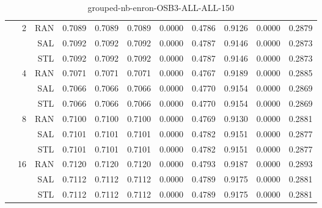 \begin{center}
\begin{table}[htbp]
\begin{tabular}{ | r | r | r | r | r | r | r | r | r | r | r |}
 & \multirow{3}{*}{2} & RAN & 0.7089 & 0.7089 & 0.7089 & 0.0000 & 0.4786 & 0.9126 & 0.0000 & 0.2879\\ \cline{3-11}
 &   & SAL & 0.7092 & 0.7092 & 0.7092 & 0.0000 & 0.4787 & 0.9146 & 0.0000 & 0.2873\\ \cline{3-11}
 &   & STL & 0.7092 & 0.7092 & 0.7092 & 0.0000 & 0.4787 & 0.9146 & 0.0000 & 0.2873\\ \cline{2-11}
 & \multirow{3}{*}{4} & RAN & 0.7071 & 0.7071 & 0.7071 & 0.0000 & 0.4767 & 0.9189 & 0.0000 & 0.2885\\ \cline{3-11}
 &   & SAL & 0.7066 & 0.7066 & 0.7066 & 0.0000 & 0.4770 & 0.9154 & 0.0000 & 0.2869\\ \cline{3-11}
 &   & STL & 0.7066 & 0.7066 & 0.7066 & 0.0000 & 0.4770 & 0.9154 & 0.0000 & 0.2869\\ \cline{2-11}
 & \multirow{3}{*}{8} & RAN & 0.7100 & 0.7100 & 0.7100 & 0.0000 & 0.4769 & 0.9130 & 0.0000 & 0.2881\\ \cline{3-11}
 &   & SAL & 0.7101 & 0.7101 & 0.7101 & 0.0000 & 0.4782 & 0.9151 & 0.0000 & 0.2877\\ \cline{3-11}
 &   & STL & 0.7101 & 0.7101 & 0.7101 & 0.0000 & 0.4782 & 0.9151 & 0.0000 & 0.2877\\ \cline{2-11}
 & \multirow{3}{*}{16} & RAN & 0.7120 & 0.7120 & 0.7120 & 0.0000 & 0.4793 & 0.9187 & 0.0000 & 0.2893\\ \cline{3-11}
 &   & SAL & 0.7112 & 0.7112 & 0.7112 & 0.0000 & 0.4789 & 0.9175 & 0.0000 & 0.2881\\ \cline{3-11}
 &   & STL & 0.7112 & 0.7112 & 0.7112 & 0.0000 & 0.4789 & 0.9175 & 0.0000 & 0.2881\\ \cline{2-11}
\hline
\end{tabular}
\caption{grouped-nb-enron-OSB3-ALL-ALL-150}
\end{table}
\end{center}

